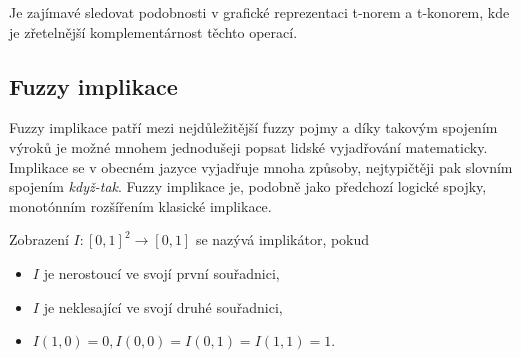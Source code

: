\begin{graph}
\end{graph}

Je zajímavé sledovat podobnosti v grafické reprezentaci t-norem a t-konorem, kde je zřetelnější komplementárnost těchto operací.

\subsection{Fuzzy implikace} 

Fuzzy implikace patří mezi nejd\r uležitější fuzzy pojmy a díky takovým spojením výrok\r u je možné mnohem jednodušeji popsat lidské vyjadřování matematicky. Implikace se v obecném jazyce vyjadřuje mnoha zp\r usoby, nejtypičtěji pak slovním spojením \textit{když-tak}. Fuzzy implikace je, podobn\v e jako p\v redchoz\'i logick\'e spojky, monot\'onn\'im roz\v s\'i\v ren\'im klasick\'e implikace.
\begin{definition}
    Zobrazení $I: [0,1]^2 \rightarrow [0,1] $ se nazývá implikátor, pokud
    \begin{itemize}
        \item $I$ je nerostoucí ve svojí první souřadnici,
        \item $I$ je neklesající ve svojí druhé souřadnici,
        \item $I(1,0) = 0, I(0,0) =  I(0,1) = I(1,1) = 1.$
    \end{itemize}
\end{definition}

